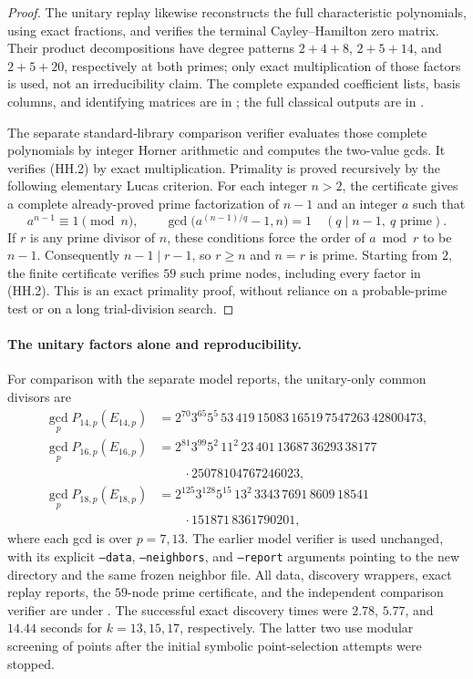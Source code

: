 \documentclass[11pt,a4paper]{article}
\theoremstyle{definition}
\begin{document}
\begin{proof}
The unitary replay likewise reconstructs the full characteristic
polynomials, using exact fractions, and verifies the terminal
Cayley--Hamilton zero matrix. Their product decompositions have
degree patterns \(2+4+8\), \(2+5+14\), and \(2+5+20\), respectively
at both primes; only exact multiplication of those factors is used,
not an irreducibility claim. The complete expanded coefficient lists,
basis columns, and identifying matrices are in
;
the full classical outputs are in
.

The separate standard-library comparison verifier evaluates those
complete polynomials by integer Horner arithmetic and computes the
two-value gcds. It verifies (HH.2) by exact multiplication.
Primality is proved recursively by the following elementary Lucas
criterion. For each integer \(n>2\), the certificate gives a complete
already-proved prime factorization of \(n-1\) and an integer \(a\)
such that
\[
 a^{n-1}\equiv1\pmod n,\qquad
 \gcd\bigl(a^{(n-1)/q}-1,n\bigr)=1
 \quad(q\mid n-1,\ q\text{ prime}).
\]
If \(r\) is any prime divisor of \(n\), these conditions force the
order of \(a\bmod r\) to be \(n-1\). Consequently \(n-1\mid r-1\),
so \(r\ge n\) and \(n=r\) is prime. Starting from \(2\), the finite
certificate verifies \(59\) such prime nodes, including every factor
in (HH.2). This is an exact primality proof, without reliance on a
probable-prime test or on a long trial-division search.
\end{proof}

\paragraph{The unitary factors alone and reproducibility.}
For comparison with the separate model reports, the unitary-only
common divisors are
\[
\begin{aligned}
\gcd_p P_{14,p}(E_{14,p})
 &=2^{70}3^{65}5^5\,53\,419\,15083\,16519\,7547263\,42800473,\\
\gcd_p P_{16,p}(E_{16,p})
 &=2^{81}3^{99}5^2\,11^2\,23\,401\,13687\,36293\,38177\\
 &\qquad{}\cdot25078104767246023,\\
\gcd_p P_{18,p}(E_{18,p})
 &=2^{125}3^{128}5^{15}\,13^2\,3343\,7691\,8609\,18541\\
 &\qquad{}\cdot151871\,8361790201,
\end{aligned}
\tag{HH.3}
\]
where each gcd is over \(p=7,13\).
The earlier model verifier is used unchanged, with its explicit
\texttt{--data}, \texttt{--neighbors}, and \texttt{--report} arguments
pointing to the new directory and the same frozen neighbor file.
All data, discovery wrappers, exact replay reports, the \(59\)-node
prime certificate, and the independent comparison verifier are under
.
The successful exact discovery times were \(2.78\), \(5.77\), and
\(14.44\) seconds for \(k=13,15,17\), respectively. The latter two
use modular screening of points after the initial symbolic
point-selection attempts were stopped.
\end{document}
